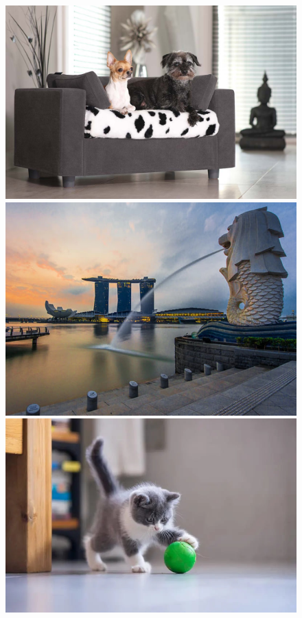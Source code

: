 \begin{figure}
\centering
\begin{minipage}{0.3\textwidth}%
 \includegraphics[width=\textwidth]{Graphics/Images/image_4.jpg}
 \caption{ }
 \label{fig:4}
\end{minipage}%
\begin{minipage}{0.3\textwidth}
 \includegraphics[width=\textwidth]{Graphics/Images/image_5.jpg}
 \caption{ }
 \label{fig:5}
\end{minipage}
\begin{minipage}{0.3\textwidth}
 \includegraphics[width=\textwidth]{Graphics/Images/image_6.jpg}

\end{minipage}
\end{figure}
